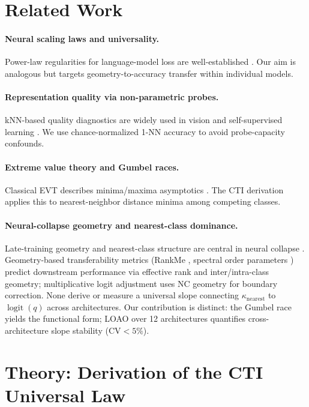 \documentclass{article}
\DeclareMathOperator{\logit}{logit}
\begin{document}
\section{Related Work}

\paragraph{Neural scaling laws and universality.}
Power-law regularities for language-model loss are well-established \citep{kaplan2020,hoffmann2022}. Our aim is analogous but targets geometry-to-accuracy transfer within individual models.

\paragraph{Representation quality via non-parametric probes.}
kNN-based quality diagnostics are widely used in vision and self-supervised learning \citep{wu2018,caron2021}. We use chance-normalized 1-NN accuracy to avoid probe-capacity confounds.

\paragraph{Extreme value theory and Gumbel races.}
Classical EVT describes minima/maxima asymptotics \citep{fisher1928,gnedenko1943,gumbel1958}. The CTI derivation applies this to nearest-neighbor distance minima among competing classes.

\paragraph{Neural-collapse geometry and nearest-class dominance.}
Late-training geometry and nearest-class structure are central in neural collapse \citep{papyan2020,han2022,zhu2021,garrido2023,rangamani2023,he2024}. Geometry-based transferability metrics (RankMe \citep{garrido2023}, spectral order parameters \citep{liu2025}) predict downstream performance via effective rank and inter/intra-class geometry; multiplicative logit adjustment \citep{ye2024} uses NC geometry for boundary correction. None derive or measure a universal slope connecting $\kappa_\mathrm{nearest}$ to $\logit(q)$ across architectures. Our contribution is distinct: the Gumbel race yields the functional form; LOAO over 12 architectures quantifies cross-architecture slope stability (CV$<5\%$).

\section{Theory: Derivation of the CTI Universal Law}
\end{document}
